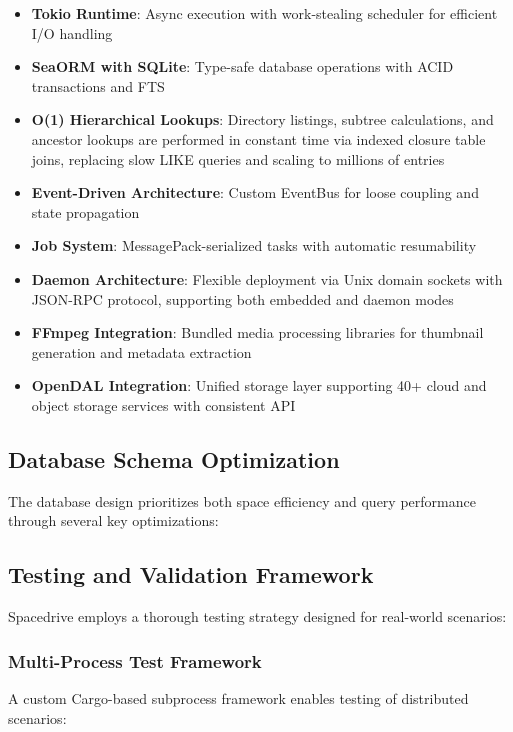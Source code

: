 \documentclass[sigconf]{acmart}
\begin{document}
\begin{itemize}[noitemsep, topsep=0pt]
 \item \textbf{Tokio Runtime}: Async execution with work-stealing scheduler for efficient I/O handling

 \item \textbf{SeaORM with SQLite}: Type-safe database operations with ACID transactions and FTS

 \item \textbf{O(1) Hierarchical Lookups}: Directory listings, subtree calculations, and ancestor lookups are performed in constant time via indexed closure table joins, replacing slow LIKE queries and scaling to millions of entries

 \item \textbf{Event-Driven Architecture}: Custom EventBus for loose coupling and state propagation

 \item \textbf{Job System}: MessagePack-serialized tasks with automatic resumability

 \item \textbf{Daemon Architecture}: Flexible deployment via Unix domain sockets with JSON-RPC protocol, supporting both embedded and daemon modes

 \item \textbf{FFmpeg Integration}: Bundled media processing libraries for thumbnail generation and metadata extraction

 \item \textbf{OpenDAL Integration}: Unified storage layer supporting 40+ cloud and object storage services with consistent API
\end{itemize}

\subsection{Database Schema Optimization}
The database design prioritizes both space efficiency and query performance through several key optimizations:



\subsection{Testing and Validation Framework}
Spacedrive employs a thorough testing strategy designed for real-world scenarios:

\subsubsection{Multi-Process Test Framework}
A custom Cargo-based subprocess framework enables testing of distributed scenarios:
\end{document}
